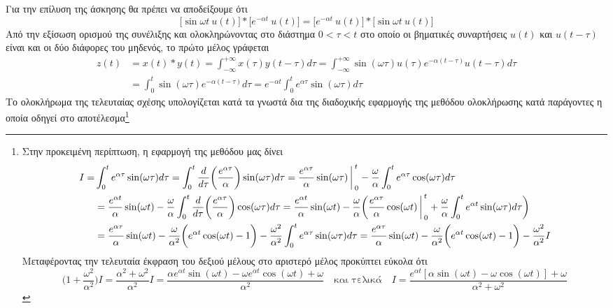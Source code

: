 \documentclass[a4paper,twoside,10pt,openany]{memoir}
\theoremstyle{dotless}
\begin{document}
\begin{solution}
Για την επίλυση της άσκησης θα πρέπει να αποδείξουμε ότι
\begin{equation*}
\bigg[\sin{\omega t}\:u(t)\bigg]\ast\bigg[e^{-\alpha t}\:u(t)\bigg]=\bigg[e^{-\alpha t}\:u(t)\bigg]\ast\bigg[\sin{\omega t}\:u(t)\bigg]
\end{equation*}
Από την εξίσωση ορισμού της συνέλιξης και ολοκληρώνοντας στο διάστημα $0<\tau<t$ στο οποίο οι βηματικές συναρτήσεις $u(t)$ και $u(t-\tau)$ είναι και οι δύο διάφορες του μηδενός, το πρώτο μέλος γράφεται
\begin{align*}
z(t)&=x(t)\ast y(t)=\int_{-\infty}^{+\infty}x(\tau)y(t-\tau)d\tau=\int_{-\infty}^{+\infty}\sin(\omega\tau)u(\tau)e^{-\alpha(t-\tau)}u(t-\tau)d\tau\\&=
\int_{0}^{t}\sin(\omega\tau)e^{-\alpha(t-\tau)}d\tau=e^{-\alpha t}\int_{0}^{t}e^{\alpha\tau}\sin(\omega\tau)d\tau
\end{align*}
Το ολοκλήρωμα της τελευταίας σχέσης υπολογίζεται κατά τα γνωστά δια της διαδοχικής εφαρμογής της μεθόδου ολοκλήρωσης κατά παράγοντες η οποία οδηγεί στο αποτέλεσμα\footnote{Στην προκειμένη περίπτωση, η εφαρμογή της μεθόδου μας δίνει
\begin{align*}
I=&\int_{0}^{t}e^{\alpha\tau}\sin(\omega\tau)d\tau=\int_{0}^{t}\frac{d}{d\tau}\bigg(\frac{e^{\alpha\tau}}{\alpha}\bigg)\sin(\omega\tau)d\tau=
\frac{e^{\alpha\tau}}{\alpha}\sin(\omega\tau)\bigg\arrowvert_{0}^{t}-\frac{\omega}{\alpha}\int_{0}^{t}e^{\alpha\tau}\cos(\omega\tau)d\tau\\&=\frac{e^{\alpha t}}{\alpha}\sin(\omega t)-\frac{\omega}{\alpha}\int_{0}^{t}\frac{d}{d\tau}\bigg(\frac{e^{\alpha\tau}}{\alpha}\bigg)\cos(\omega\tau)d\tau=
\frac{e^{\alpha t}}{\alpha}\sin(\omega t)-\frac{\omega}{\alpha}\bigg(\frac{e^{\alpha\tau}}{\alpha}\cos(\omega t)\bigg\arrowvert_{0}^{t}+\frac{\omega}{\alpha}\int_{0}^{t}
e^{\alpha t}\sin(\omega\tau)d\tau\bigg)\\&=\frac{e^{\alpha\tau}}{\alpha}\sin(\omega t)-\frac{\omega}{\alpha^2}\bigg(e^{\alpha t}\cos(\omega t)-1\bigg)-
\frac{\omega^2}{\alpha^2}\int_{0}^{t}e^{\alpha\tau}\sin(\omega\tau)d\tau=
\frac{e^{\alpha\tau}}{\alpha}\sin(\omega t)-\frac{\omega}{\alpha^2}\bigg(e^{\alpha t}\cos(\omega t)-1\bigg)-
\frac{\omega^2}{\alpha^2}I
\end{align*}
Μεταφέροντας την τελευταία έκφραση του δεξιού μέλους στο αριστερό μέλος προκύπτει εύκολα ότι
\begin{equation*}
\bigg(1+\frac{\omega^2}{\alpha^2}\bigg)I=\frac{\alpha^2+\omega^2}{\alpha^2}I=\frac{\alpha e^{\alpha t}\sin(\omega t)-\omega e^{\alpha t}\cos(\omega t)+\omega}{\alpha^2}\quad\mbox{και τελικά}\quad I=\frac{e^{\alpha t}[\alpha\sin(\omega t)-\omega\cos(\omega t)]+\omega}{\alpha^2+\omega^2}

\end{equation*}}
\end{solution}
\end{document}
